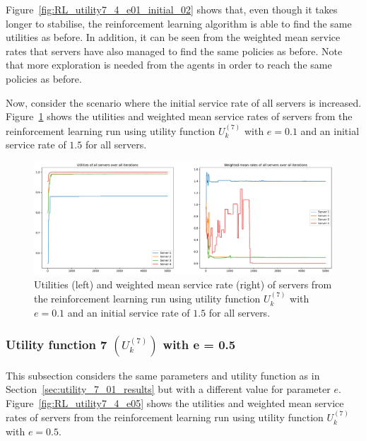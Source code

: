 Figure~\ref{fig:RL_utility7_4_e01_initial_02} shows that, even though it takes
longer to stabilise, the reinforcement learning algorithm is able to find the
same utilities as before.
In addition, it can be seen from the weighted mean service rates that servers
have also managed to find the same policies as before.
Note that more exploration is needed from the agents in order to reach the
same policies as before.

Now, consider the scenario where the initial service rate of all servers is
increased.
Figure~\ref{fig:RL_utility7_4_e01_initial_15} shows the utilities and weighted
mean service rates of servers from the reinforcement learning run using utility
function \(U_k^{(7)}\) with \(e = 0.1\) and an initial service rate of
\(1.5\) for all servers.

\begin{figure}[H]
    \includegraphics[width=\textwidth]{chapters/06_agent_based_extension/Bin/reinforcement_learning_results/utility_7/u7_4_e01_initial_15.pdf}
    \caption{Utilities (left) and weighted mean service rate (right) of servers
    from the reinforcement learning run using utility function \(U_k^{(7)}\)
    with \(e = 0.1\) and an initial service rate of \(1.5\) for all servers.}
    \label{fig:RL_utility7_4_e01_initial_15}
\end{figure}





\subsubsection{Utility function 7 \((U_k^{(7)})\) with e = 0.5}
\label{sec:utility_7_05_results}

This subsection considers the same parameters and utility function as in
Section~\ref{sec:utility_7_01_results} but with a different value for
parameter \(e\).
Figure~\ref{fig:RL_utility7_4_e05} shows the utilities and weighted mean
service rates of servers from the reinforcement learning run using utility
function \(U_k^{(7)}\) with \(e = 0.5\).

